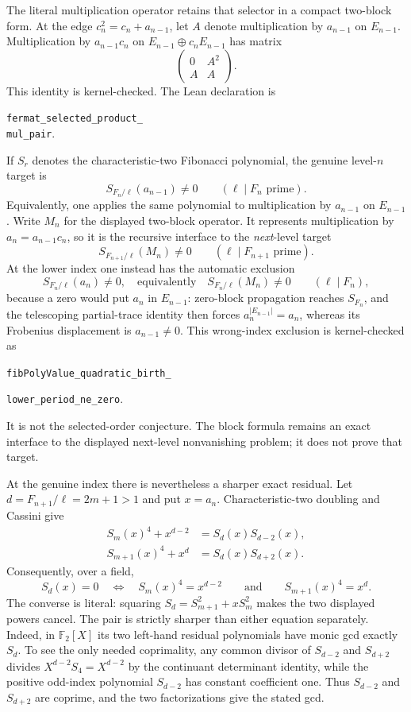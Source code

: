 \documentclass[11pt]{article}
\theoremstyle{definition}
\theoremstyle{remark}
\begin{document}
The literal multiplication operator retains that selector in a compact
two-block form.  At the edge $c_n^2=c_n+a_{n-1}$, let $A$ denote
multiplication by $a_{n-1}$ on $E_{n-1}$.  Multiplication by
$a_{n-1}c_n$ on $E_{n-1}\oplus c_nE_{n-1}$ has matrix
\[
 \begin{pmatrix}0&A^2\\ A&A\end{pmatrix}.
\]
This identity is kernel-checked.  The Lean declaration is
\begin{center}
\texttt{fermat\_selected\_product\_}\\
\texttt{mul\_pair}.
\end{center}
If $S_r$ denotes the characteristic-two Fibonacci polynomial, the genuine
level-$n$ target is
\[
 S_{F_n/\ell}(a_{n-1})\ne0\qquad(\ell\mid F_n\text{ prime}).
\]
Equivalently, one applies the same polynomial to multiplication by
$a_{n-1}$ on $E_{n-1}$.  Write $M_n$ for the displayed two-block operator.
It represents multiplication by $a_n=a_{n-1}c_n$, so it is the recursive
interface to the \emph{next}-level target
\[
 S_{F_{n+1}/\ell}(M_n)\ne0
 \qquad(\ell\mid F_{n+1}\text{ prime}).
\]
At the lower index one instead has the automatic exclusion
\[
 S_{F_n/\ell}(a_n)\ne0,
 \quad\text{equivalently}\quad
 S_{F_n/\ell}(M_n)\ne0
 \qquad(\ell\mid F_n),
\]
because a zero would put $a_n$ in $E_{n-1}$: zero-block propagation reaches
$S_{F_n}$, and the telescoping partial-trace identity then forces
$a_n^{|E_{n-1}|}=a_n$, whereas its Frobenius displacement is
$a_{n-1}\ne0$.  This wrong-index exclusion is kernel-checked as
\begin{center}
\texttt{fibPolyValue\_quadratic\_birth\_}\par
\texttt{lower\_period\_ne\_zero}.
\end{center}
It is not the selected-order conjecture.  The block formula remains an exact
interface to the displayed next-level nonvanishing problem; it does not prove
that target.

At the genuine index there is nevertheless a sharper exact residual.  Let
$d=F_{n+1}/\ell=2m+1>1$ and put $x=a_n$.  Characteristic-two doubling and
Cassini give
\begin{align*}
 S_m(x)^4+x^{d-2}&=S_d(x)S_{d-2}(x),\\
 S_{m+1}(x)^4+x^d&=S_d(x)S_{d+2}(x).
\end{align*}
Consequently, over a field,
\[
 S_d(x)=0
 \quad\Longleftrightarrow\quad
 S_m(x)^4=x^{d-2}
 \qquad\text{and}\qquad
 S_{m+1}(x)^4=x^d.
\]
The converse is literal: squaring
$S_d=S_{m+1}^2+xS_m^2$ makes the two displayed powers cancel.  The pair is
strictly sharper than either equation separately.  Indeed, in
$\mathbb F_2[X]$ its two left-hand residual polynomials have monic gcd exactly
$S_d$.  To see the only needed coprimality, any common divisor of
$S_{d-2}$ and $S_{d+2}$ divides $X^{d-2}S_4=X^{d-2}$ by the continuant
determinant identity, while the positive odd-index polynomial $S_{d-2}$ has
constant coefficient one.  Thus $S_{d-2}$ and $S_{d+2}$ are coprime, and
the two factorizations give the stated gcd.
\end{document}

